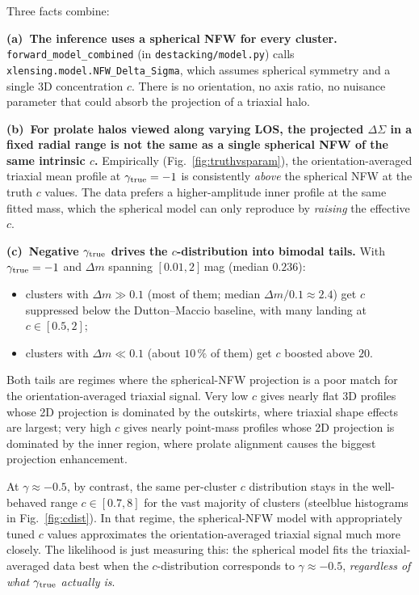 \documentclass[11pt,a4paper]{article}
\newcommand{\gtrue}{\gamma_{\rm true}}
\newcommand{\dm}{\Delta m}
\begin{document}
Three facts combine:

\textbf{(a)~The inference uses a spherical NFW for every cluster.}
\texttt{forward\_model\_combined} (in \texttt{destacking/model.py}) calls
\texttt{xlensing.model.NFW\_Delta\_Sigma}, which assumes spherical symmetry and
a single 3D concentration $c$. There is no orientation, no axis ratio, no
nuisance parameter that could absorb the projection of a triaxial halo.

\textbf{(b)~For prolate halos viewed along varying LOS, the projected
$\Delta\Sigma$ in a fixed radial range is not the same as a single spherical
NFW of the same intrinsic $c$.}  Empirically
(Fig.~\ref{fig:truthvsparam}), the orientation-averaged triaxial mean profile
at $\gtrue=-1$ is consistently \emph{above} the spherical NFW at the truth
$c$ values.  The data prefers a higher-amplitude inner profile at the same
fitted mass, which the spherical model can only reproduce by \emph{raising} the
effective $c$.

\textbf{(c)~Negative $\gtrue$ drives the $c$-distribution into bimodal tails.}
With $\gtrue=-1$ and $\dm$ spanning $[0.01, 2]$\,mag (median $0.236$):
\begin{itemize}
\item clusters with $\dm \gg 0.1$ (most of them; median $\dm/0.1 \approx 2.4$) get
$c$ suppressed below the Dutton--Maccio baseline, with many landing at
$c \in [0.5, 2]$;
\item clusters with $\dm \ll 0.1$ (about $10\,\%$ of them) get $c$ boosted above
$20$.
\end{itemize}
Both tails are regimes where the spherical-NFW projection is a poor match for
the orientation-averaged triaxial signal.  Very low $c$ gives nearly flat 3D
profiles whose 2D projection is dominated by the outskirts, where triaxial
shape effects are largest; very high $c$ gives nearly point-mass profiles whose
2D projection is dominated by the inner region, where prolate alignment causes
the biggest projection enhancement.

At $\gamma \approx -0.5$, by contrast, the same per-cluster $c$ distribution
stays in the well-behaved range $c \in [0.7, 8]$ for the vast majority of
clusters (steelblue histograms in Fig.~\ref{fig:cdist}).  In that regime, the
spherical-NFW model with appropriately tuned $c$ values approximates the
orientation-averaged triaxial signal much more closely.  The likelihood is just
measuring this: the spherical model fits the triaxial-averaged data best when
the $c$-distribution corresponds to $\gamma \approx -0.5$,
\emph{regardless of what $\gtrue$ actually is}.
\end{document}
